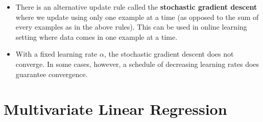 \documentclass[10pt]{article}
\begin{document}
\begin{itemize}
    \item There is an alternative update rule called the
        {\bf stochastic gradient descent} where we update
        using only one example at a time (as opposed to
        the sum of every examples as in the above rules).
        This can be used in online learning setting where
        data comes in one example at a time.
        
    \item With a fixed learning rate $\alpha$, the stochastic
        gradient descent does not converge. In some cases,
        however, a schedule of decreasing learning rates
        does guarantee convergence.
\end{itemize}

\section{Multivariate Linear Regression}
\end{document}
